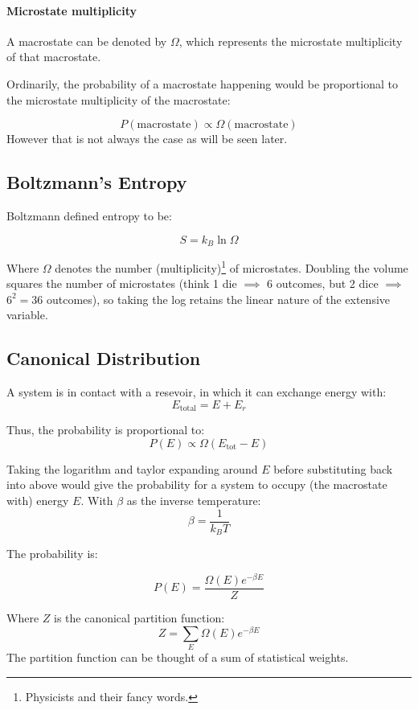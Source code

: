 \documentclass[12pt]{article}
\begin{document}
 
\paragraph{Microstate multiplicity}
A macrostate can be denoted by $\Omega$, which represents the microstate multiplicity of that macrostate. 

Ordinarily, the probability of a macrostate happening would be proportional to the microstate multiplicity of the macrostate:

\[P(\text{macrostate}) \propto \Omega(\text{macrostate})\]
However that is not always the case as will be seen later.

\subsection{Boltzmann's Entropy}

Boltzmann defined entropy to be:

\[ \boxed{S = k_B \ln{\Omega}}\]



Where $\Omega$ denotes the number (multiplicity)\footnote{Physicists and their fancy words.} of microstates. Doubling the volume squares the number of microstates (think 1 die $\implies$ 6 outcomes, but 2 dice $\implies$ $6^2=36$ outcomes), so taking the log retains the linear nature of the extensive variable.


\subsection{Canonical Distribution}

A system is in contact with a resevoir, in which it can exchange energy with:
\[ E_\text{total} = E + E_r\]

Thus, the probability is proportional to:
\[ P(E) \propto \Omega(E_\text{tot} - E)\]


Taking the logarithm and taylor expanding around $E$ before substituting back into above would give the probability for a system to occupy (the macrostate with) energy $E$. With $\beta$ as the inverse temperature:
\[\beta = \frac{1}{k_B T}\]

The probability is:

\[\boxed{P(E) = \frac{\Omega(E)e^{-\beta E}}{Z}}\]

Where $Z$ is the canonical partition function:
\[\boxed{Z = \sum_E\Omega(E)e^{-\beta E}}\]
The partition function can be thought of a sum of statistical weights.
\end{document}
